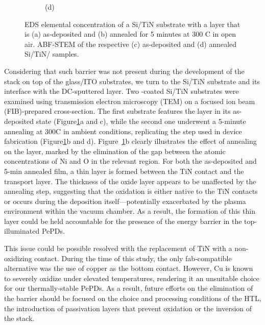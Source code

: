 \begin{figure}[htbp]
\begin{subfigure}[t]{0.35\textwidth}
        \caption*{(d)}
    \end{subfigure}
    \caption{EDS elemental concentration of a Si/TiN substrate with a  layer that is (a) as-deposited and (b) annealed for 5 minutes at 300 \degree C in open air. ABF-STEM of the respective (c) as-deposited and (d) annealed Si/TiN/ samples.}
    \label{fig:pix_pepd:tem_on_nio}
\end{figure}

Considering that such barrier was not present during the development of the stack on top of the glass/ITO substrates, we turn to the Si/TiN substrate and its interface with the DC-sputtered  layer. Two -coated Si/TiN substrates were examined using transmission electron microscopy (TEM) on a focused ion beam (FIB)-prepared cross-section. The first substrate features the  layer in its as-deposited state (Figure\ref{fig:pix_pepd:tem_on_nio}a and c), while the second one underwent a 5-minute annealing at 300\degree C in ambient conditions, replicating the step used in device fabrication (Figure\ref{fig:pix_pepd:tem_on_nio}b and d). Figure~\ref{fig:pix_pepd:tem_on_nio}b clearly illustrates the effect of annealing on the  layer, marked by the elimination of the gap between the atomic concentrations of Ni and O in the relevant region. For both the as-deposited and 5-min annealed film, a thin  layer is formed between the TiN contact and the  transport layer. The thickness of the oxide layer appears to be unaffected by the annealing step, suggesting that the oxidation is either native to the TiN contacts or  occurs during the  deposition itself—potentially exacerbated by the plasma environment within the vacuum chamber. As a result, the formation of this thin  layer could be held accountable for the presence of the energy barrier in the top-illuminated PePDs. 

This issue could be possible resolved with the replacement of TiN with a non-oxidizing contact. During the time of this study, the only fab-compatible alternative was the use of copper as the bottom contact. However, Cu is known to severely oxidize under elevated temperatures, rendering it an unsuitable choice for our thermally-stable PePDs. As a result, future efforts on the elimination of the  barrier should be focused on the choice and processing conditions of the HTL, the introduction of passivation layers that prevent oxidation or the inversion of the stack. 

